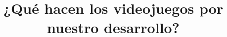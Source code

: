 \documentclass{bmcart}
\begin{document}
\begin{frontmatter}

\begin{fmbox}


\title{¿Qué hacen los videojuegos por nuestro desarrollo?}


\author[
   addressref={aff1},                   %
   corref={aff1},                       %
   noteref={n1},                        %
   email={iscgonzpame@gmail.com}   %
]
{ }



\address[id=aff1]{%
  , %
  ,                     %
  ,                              %
}




\end{fmbox}
\end{frontmatter}
\end{document}
